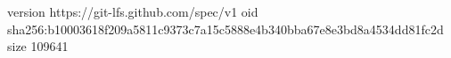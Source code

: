 version https://git-lfs.github.com/spec/v1
oid sha256:b10003618f209a5811c9373c7a15c5888e4b340bba67e8e3bd8a4534dd81fc2d
size 109641
